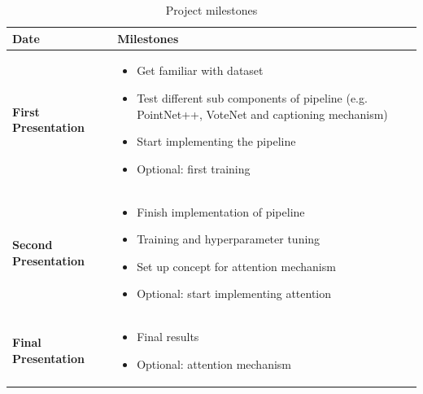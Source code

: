 \documentclass[10pt,twocolumn,letterpaper]{article}
\begin{document}
\begin{table}
	\centering
	\begin{tabularx}{\textwidth}{l|l}
	\textbf{Date} & \textbf{Milestones} \\
	\hline
	\textbf{First Presentation} & 
	\begin{minipage}[t]{\textwidth}
		\begin{itemize}[nosep, wide=0pt, leftmargin=*, after=\strut]
			\item Get familiar with dataset
			\item Test different sub components of pipeline (e.g. PointNet++, VoteNet and captioning mechanism)
			\item Start implementing the pipeline
			\item Optional: first training
		\end{itemize}  
	\end{minipage}\\
	\hline
	\textbf{Second Presentation} & 
	\begin{minipage}[t]{\linewidth}
		\begin{itemize}[nosep, wide=0pt, leftmargin=*, after=\strut]
			\item Finish implementation of pipeline
			\item Training and hyperparameter tuning
			\item Set up concept for attention mechanism
			\item Optional: start implementing attention
		\end{itemize}  
	\end{minipage}\\
	\hline
	\textbf{Final Presentation} & 
	\begin{minipage}[t]{\linewidth}
		\begin{itemize}[nosep, wide=0pt, leftmargin=*, after=\strut]
			\item Final results
			\item Optional: attention mechanism
		\end{itemize}  
	\end{minipage}\\
	\end{tabularx}
	\caption{Project milestones}
	\label{tab:milestones}
\end{table}

{\small


}
\end{document}
